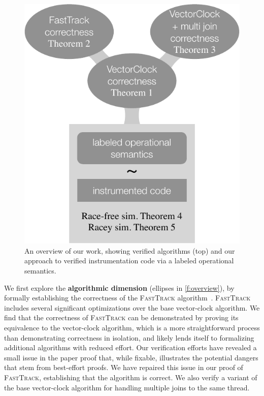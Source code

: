 \documentclass[preprint, 10pt]{sigplanconf}
\newcommand{\FT}{\textsc{FastTrack}\xspace}
\begin{document}
\begin{figure}[t]
\centering
 \includegraphics[width=0.6\columnwidth]{overview.pdf}
 \caption{An overview of our work, showing verified algorithms (top) and our approach to verified instrumentation code via a labeled operational semantics.}
 \label{f:overview}
\end{figure}

We first explore the \textbf{algorithmic dimension} (ellipses in \autoref{f:overview}), by formally establishing the correctness of the \FT algorithm~\cite{fasttrack}. \FT includes several significant optimizations over the base vector-clock algorithm. We find that the correctness of \FT can be demonstrated by proving its equivalence to the vector-clock algorithm, which is a more straightforward process than demonstrating correctness in isolation, and likely lends itself to formalizing additional algorithms with reduced effort. Our verification efforts have revealed a small issue in the paper proof that, while fixable, illustrates the potential dangers that stem from best-effort proofs. We have repaired this issue in our proof of \FT, establishing that the algorithm is correct. We also verify a variant of the base vector-clock algorithm for handling multiple joins to the same thread.
\end{document}

